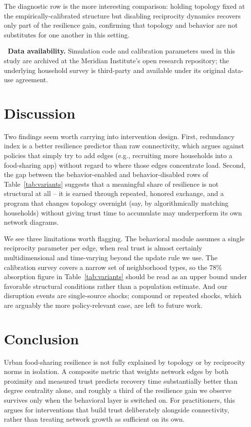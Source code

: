 \documentclass[10pt,twocolumn]{article}
\begin{document}
The diagnostic row is the more interesting comparison: holding topology
fixed at the empirically-calibrated structure but disabling reciprocity
dynamics recovers only part of the resilience gain, confirming that
topology and behavior are not substitutes for one another in this
setting.

\begin{notebox}
\textbf{\color{inkblue}\faInfoCircle\ Data availability.} Simulation code
and calibration parameters used in this study are archived at the
Meridian Institute's open research repository; the underlying household
survey is third-party and available under its original data-use
agreement.
\end{notebox}

\section{Discussion}
\label{sec:discussion}

Two findings seem worth carrying into intervention design. First,
redundancy index is a better resilience predictor than raw connectivity,
which argues against policies that simply try to add edges (e.g.,
recruiting more households into a food-sharing app) without regard to
where those edges concentrate load. Second, the gap between the
behavior-enabled and behavior-disabled rows of
Table~\ref{tab:variants} suggests that a meaningful share of resilience
is not structural at all -- it is earned through repeated, honored
exchange, and a program that changes topology overnight (say, by
algorithmically matching households) without giving trust time to
accumulate may underperform its own network diagrams.

We see three limitations worth flagging. The behavioral module assumes a
single reciprocity parameter per edge, when real trust is almost
certainly multidimensional and time-varying beyond the update rule we
use. The calibration survey covers a narrow set of neighborhood types,
so the 78\% absorption figure in Table~\ref{tab:variants} should be read
as an upper bound under favorable structural conditions rather than a
population estimate. And our disruption events are single-source shocks;
compound or repeated shocks, which are arguably the more policy-relevant
case, are left to future work.

\section{Conclusion}
Urban food-sharing resilience is not fully explained by topology or by
reciprocity norms in isolation. A composite metric that weights network
edges by both proximity and measured trust predicts recovery time
substantially better than degree centrality alone, and roughly a third of
the resilience gain we observe survives only when the behavioral layer is
switched on. For practitioners, this argues for interventions that build
trust deliberately alongside connectivity, rather than treating network
growth as sufficient on its own.
\end{document}
